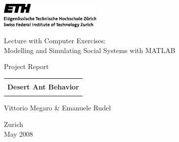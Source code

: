 
\thispagestyle{empty}

\begin{center}
\includegraphics[width=5cm]{ETHlogo.eps}

\bigskip


\bigskip


\bigskip


\LARGE{Lecture with Computer Exercises:\\ }
\LARGE{Modelling and Simulating Social Systems with MATLAB\\}

\bigskip

\bigskip

\small{Project Report}\\

\bigskip

\bigskip

\bigskip

\bigskip


\begin{tabular}{|c|}
\hline
\\
\textbf{\LARGE{Desert Ant Behavior}}\\
\\
\hline
\end{tabular}
\bigskip

\bigskip

\bigskip

\LARGE{Vittorio Megaro \& Emanuele Rudel}



\bigskip

\bigskip

\bigskip

\bigskip

\bigskip

\bigskip

\bigskip

\bigskip

Zurich\\
May 2008\\

\end{center}


